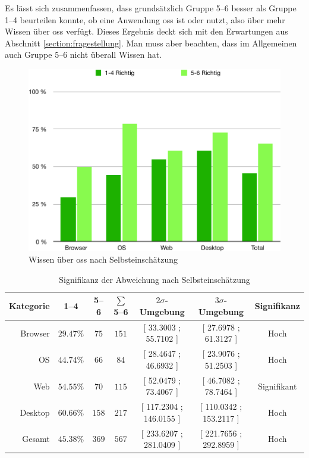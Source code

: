 \documentclass[a4paper]{article}
\begin{document}
                    Es lässt sich zusammenfassen, dass grundsätzlich Gruppe 5--6 besser als Gruppe 1--4 beurteilen konnte, ob eine Anwendung \gls{oss} ist oder nutzt, also über mehr Wissen über \gls{oss} verfügt. Dieses Ergebnis deckt sich mit den Erwartungen aus Abschnitt \ref{section:fragestellung}. Man muss aber beachten, dass im Allgemeinen auch Gruppe 5--6 nicht überall Wissen hat.
                    
                \begin{figure}
                    \includegraphics[width=\textwidth]{assets/results/openSourceJudging/openSourceJudgingDetailedOSSOnlyByKnowledge.pdf}
                    \caption{Wissen über \gls{oss} nach Selbsteinschätzung}
                    \label{figure:knowledge_by_category_self_assessment}
                \end{figure}
                
                \begin{table}
                    \centering
                    \begin{tabular}{rcccccc}
                        Kategorie & 1--4 & 5--6 & $\sum$ 5--6 & $2\sigma$-Umgebung & $3\sigma$-Umgebung & Signifikanz \\\hline\hline
                        Browser & $29.47\%$ & $75$ & $151$ & \tiny [ 33.3003 ; 55.7102 ] & \tiny [ 27.6978 ; 61.3127 ] & Hoch\\
                        OS & $44.74\%$ & $66$ & $84$ & \tiny  [ 28.4647 ; 46.6932 ]  &  \tiny  [ 23.9076 ; 51.2503 ]  & Hoch\\
                        Web & $54.55\%$ & $70$ & $115$ & \tiny [ 52.0479 ; 73.4067 ] &  \tiny  [ 46.7082 ; 78.7464 ]  &  Signifikant\\
                        Desktop & $60.66\%$ & $158$ & $217$ & \tiny  [ 117.2304 ; 146.0155 ]  & \tiny  [ 110.0342 ; 153.2117 ]  & Hoch\\\hline
                        Gesamt & $45.38\%$ & $369$ & $567$ & \tiny [ 233.6207 ; 281.0409 ] & \tiny  [ 221.7656 ; 292.8959 ] & Hoch
                    \end{tabular}
                    \caption{Signifikanz der Abweichung nach Selbsteinschätzung}
                    \label{table:knowledge_by_category_sigma_self_assessment}
                \end{table}
            
\end{document}
